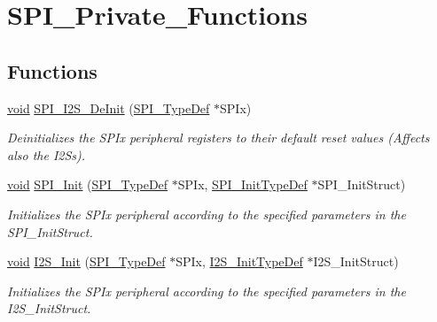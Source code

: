 \hypertarget{group___s_p_i___private___functions}{}\section{S\+P\+I\+\_\+\+Private\+\_\+\+Functions}
\label{group___s_p_i___private___functions}
\subsection*{Functions}
\begin{DoxyCompactItemize}
\item 
\hyperlink{usb__devapi_8h_afabf60e7f57651d6d595a02c75f07cd0}{void} \hyperlink{group___s_p_i___private___functions_gabe36880945fa56785283a9c0092124cc}{S\+P\+I\+\_\+\+I2\+S\+\_\+\+De\+Init} (\hyperlink{struct_s_p_i___type_def}{S\+P\+I\+\_\+\+Type\+Def} $\ast$S\+P\+Ix)
\begin{DoxyCompactList}\small\item\em Deinitializes the S\+P\+Ix peripheral registers to their default reset values (Affects also the I2\+Ss). \end{DoxyCompactList}\item 
\hyperlink{usb__devapi_8h_afabf60e7f57651d6d595a02c75f07cd0}{void} \hyperlink{group___s_p_i___private___functions_ga8dacc1dc48bf08c0f12da409f4889037}{S\+P\+I\+\_\+\+Init} (\hyperlink{struct_s_p_i___type_def}{S\+P\+I\+\_\+\+Type\+Def} $\ast$S\+P\+Ix, \hyperlink{struct_s_p_i___init_type_def}{S\+P\+I\+\_\+\+Init\+Type\+Def} $\ast$S\+P\+I\+\_\+\+Init\+Struct)
\begin{DoxyCompactList}\small\item\em Initializes the S\+P\+Ix peripheral according to the specified parameters in the S\+P\+I\+\_\+\+Init\+Struct. \end{DoxyCompactList}\item 
\hyperlink{usb__devapi_8h_afabf60e7f57651d6d595a02c75f07cd0}{void} \hyperlink{group___s_p_i___private___functions_ga53661884ae4a9640df7cbc59187782f7}{I2\+S\+\_\+\+Init} (\hyperlink{struct_s_p_i___type_def}{S\+P\+I\+\_\+\+Type\+Def} $\ast$S\+P\+Ix, \hyperlink{struct_i2_s___init_type_def}{I2\+S\+\_\+\+Init\+Type\+Def} $\ast$I2\+S\+\_\+\+Init\+Struct)
\begin{DoxyCompactList}\small\item\em Initializes the S\+P\+Ix peripheral according to the specified parameters in the I2\+S\+\_\+\+Init\+Struct. \end{DoxyCompactList}\item 

\end{DoxyCompactItemize}
